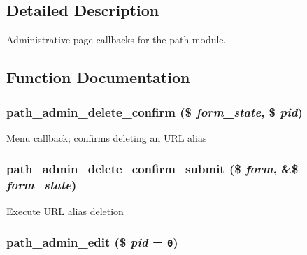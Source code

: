 \subsection{Detailed Description}
Administrative page callbacks for the path module. 

\subsection{Function Documentation}
\hypertarget{path_8admin_8inc_52aa64c47584180398592cec25cc53d5}{
\subsubsection[{path\_\-admin\_\-delete\_\-confirm}]{\setlength{\rightskip}{0pt plus 5cm}path\_\-admin\_\-delete\_\-confirm (\$ {\em form\_\-state}, \/  \$ {\em pid})}}
\label{path_8admin_8inc_52aa64c47584180398592cec25cc53d5}


Menu callback; confirms deleting an URL alias \hypertarget{path_8admin_8inc_11e17265eec5e2e31acf2c251f270e78}{
\subsubsection[{path\_\-admin\_\-delete\_\-confirm\_\-submit}]{\setlength{\rightskip}{0pt plus 5cm}path\_\-admin\_\-delete\_\-confirm\_\-submit (\$ {\em form}, \/  \&\$ {\em form\_\-state})}}
\label{path_8admin_8inc_11e17265eec5e2e31acf2c251f270e78}


Execute URL alias deletion \hypertarget{path_8admin_8inc_9956956a3d5f93a0462fd8bdb1ed6154}{
\subsubsection[{path\_\-admin\_\-edit}]{\setlength{\rightskip}{0pt plus 5cm}path\_\-admin\_\-edit (\$ {\em pid} = {\tt 0})}}
\label{path_8admin_8inc_9956956a3d5f93a0462fd8bdb1ed6154}


